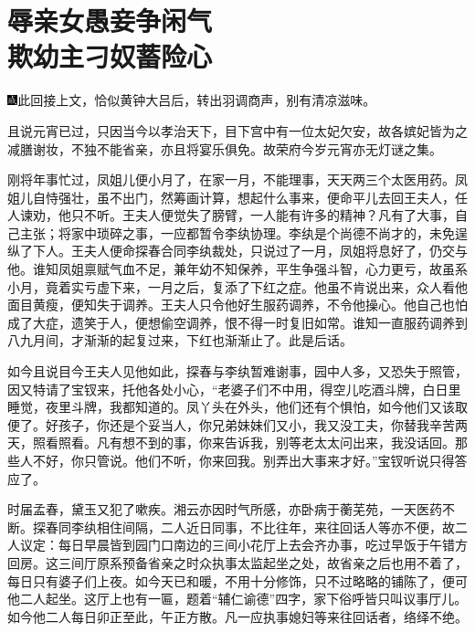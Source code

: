 

\chapter{辱亲女愚妾争闲气\\欺幼主刁奴蓄险心}

{\includegraphics[width=3mm]{../Images/00005}此回接上文，恰似黄钟大吕后，转出羽调商声，别有清凉滋味。}

且说元宵已过，只因当今以孝治天下，目下宫中有一位太妃欠安，故各嫔妃皆为之减膳谢妆，不独不能省亲，亦且将宴乐俱免。故荣府今岁元宵亦无灯谜之集。

刚将年事忙过，凤姐儿便小月了，在家一月，不能理事，天天两三个太医用药。凤姐儿自恃强壮，虽不出门，然筹画计算，想起什么事来，便命平儿去回王夫人，任人谏劝，他只不听。王夫人便觉失了膀臂，一人能有许多的精神？凡有了大事，自己主张；将家中琐碎之事，一应都暂令李纨协理。李纨是个尚德不尚才的，未免逞纵了下人。王夫人便命探春合同李纨裁处，只说过了一月，凤姐将息好了，仍交与他。谁知凤姐禀赋气血不足，兼年幼不知保养，平生争强斗智，心力更亏，故虽系小月，竟着实亏虚下来，一月之后，复添了下红之症。他虽不肯说出来，众人看他面目黄瘦，便知失于调养。王夫人只令他好生服药调养，不令他操心。他自己也怕成了大症，遗笑于人，便想偷空调养，恨不得一时复旧如常。谁知一直服药调养到八九月间，才渐渐的起复过来，下红也渐渐止了。此是后话。

如今且说目今王夫人见他如此，探春与李纨暂难谢事，园中人多，又恐失于照管，因又特请了宝钗来，托他各处小心，``老婆子们不中用，得空儿吃酒斗牌，白日里睡觉，夜里斗牌，我都知道的。凤丫头在外头，他们还有个惧怕，如今他们又该取便了。好孩子，你还是个妥当人，你兄弟妹妹们又小，我又没工夫，你替我辛苦两天，照看照看。凡有想不到的事，你来告诉我，别等老太太问出来，我没话回。那些人不好，你只管说。他们不听，你来回我。别弄出大事来才好。''宝钗听说只得答应了。

时届孟春，黛玉又犯了嗽疾。湘云亦因时气所感，亦卧病于蘅芜苑，一天医药不断。探春同李纨相住间隔，二人近日同事，不比往年，来往回话人等亦不便，故二人议定：每日早晨皆到园门口南边的三间小花厅上去会齐办事，吃过早饭于午错方回房。这三间厅原系预备省亲之时众执事太监起坐之处，故省亲之后也用不着了，每日只有婆子们上夜。如今天已和暖，不用十分修饰，只不过略略的铺陈了，便可他二人起坐。这厅上也有一匾，题着``辅仁谕德''四字，家下俗呼皆只叫议事厅儿。如今他二人每日卯正至此，午正方散。凡一应执事媳妇等来往回话者，络绎不绝。

